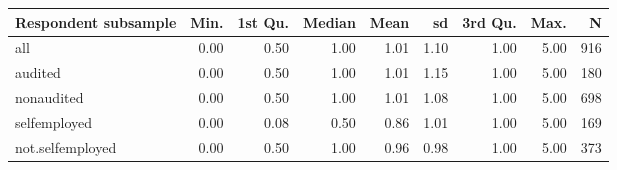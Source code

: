 \begin{table}[ht]
\centering
\begin{tabular}{lrrrrrrrr}
  \hline
Respondent subsample & Min. & 1st Qu. & Median & Mean & sd & 3rd Qu. & Max. & N \\ 
  \hline
all & 0.00 & 0.50 & 1.00 & 1.01 & 1.10 & 1.00 & 5.00 & 916 \\ 
  audited & 0.00 & 0.50 & 1.00 & 1.01 & 1.15 & 1.00 & 5.00 & 180 \\ 
  nonaudited & 0.00 & 0.50 & 1.00 & 1.01 & 1.08 & 1.00 & 5.00 & 698 \\ 
  selfemployed & 0.00 & 0.08 & 0.50 & 0.86 & 1.01 & 1.00 & 5.00 & 169 \\ 
  not.selfemployed & 0.00 & 0.50 & 1.00 & 0.96 & 0.98 & 1.00 & 5.00 & 373 \\ 
   \hline
\end{tabular}
\end{table}

